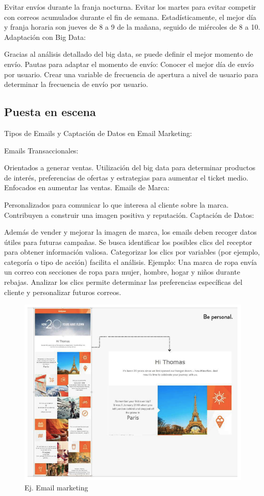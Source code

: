 \documentclass[
    a4paper, %
    10pt, %
    unnumberedsections, %
    twoside, %
]{LTJournalArticle}
\begin{document}
Evitar envíos durante la franja nocturna.
Evitar los martes para evitar competir con correos acumulados durante el fin de semana.
Estadísticamente, el mejor día y franja horaria son jueves de 8 a 9 de la mañana, seguido de miércoles de 8 a 10.
Adaptación con Big Data:

Gracias al análisis detallado del big data, se puede definir el mejor momento de envío.
Pautas para adaptar el momento de envío:
Conocer el mejor día de envío por usuario.
Crear una variable de frecuencia de apertura a nivel de usuario para determinar la frecuencia de envío por usuario.



\subsection{Puesta en escena}

Tipos de Emails y Captación de Datos en Email Marketing:

Emails Transaccionales:

Orientados a generar ventas.
Utilización del big data para determinar productos de interés, preferencias de ofertas y estrategias para aumentar el ticket medio.
Enfocados en aumentar las ventas.
Emails de Marca:

Personalizados para comunicar lo que interesa al cliente sobre la marca.
Contribuyen a construir una imagen positiva y reputación.
Captación de Datos:

Además de vender y mejorar la imagen de marca, los emails deben recoger datos útiles para futuras campañas.
Se busca identificar los posibles clics del receptor para obtener información valiosa.
Categorizar los clics por variables (por ejemplo, categoría o tipo de acción) facilita el análisis.
Ejemplo: Una marca de ropa envía un correo con secciones de ropa para mujer, hombre, hogar y niños durante rebajas. Analizar los clics permite determinar las preferencias específicas del cliente y personalizar futuros correos.


\begin{figure}[h]
  \centering
  \includegraphics[width=0.7\linewidth]{./images/ex-mailmkt.jpg}
  \caption{Ej. Email marketing}
  \label{fig:etiqueta}
\end{figure}
\end{document}
